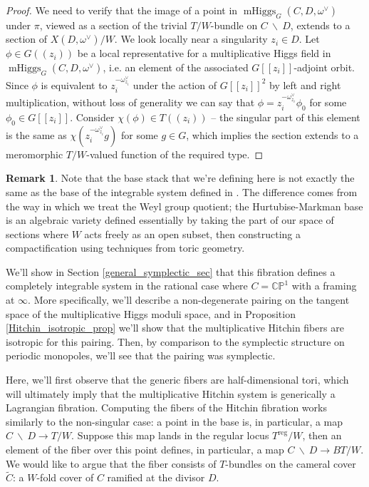 \documentclass[11pt, oneside, reqno]{amsart}
\theoremstyle{definition} \newtheorem{definition}{Definition}[section]
\theoremstyle{definition} \newtheorem{remark}[definition]{Remark}
\theoremstyle{definition} \newtheorem{remarks}[definition]{Remarks}
\theoremstyle{definition} \newtheorem{question}[definition]{Question}
\theoremstyle{definition} \newtheorem*{note}{Note}
\theoremstyle{definition} \newtheorem{example}[definition]{Example}
\theoremstyle{definition} \newtheorem{examples}[definition]{Examples}
\newcommand{\bb}[1]{\mathbb{#1}}
\newcommand{\mr}[1]{\mathrm{#1}}
\newcommand{\wt}[1]{\widetilde{#1}}
\newcommand{\bs}{\ \backslash \ }
\DeclareMathOperator{\mhiggs}{mHiggs}
\begin{document}
\begin{proof}
We need to verify that the image of a point in $\mhiggs_G(C,D,\omega^\vee)$ under $\pi$, viewed as a section of the trivial $T/W$-bundle on $C \bs D$, extends to a section of $X(D,\omega^\vee)/W$.  We look locally near a singularity $z_i \in D$.  Let $\phi \in G((z_i))$ be a local representative for a multiplicative Higgs field in $\mhiggs_G(C,D,\omega^\vee)$, i.e. an element of the associated $G[[z_i]]$-adjoint orbit.  Since $\phi$ is equivalent to $z_i^{-\omega^\vee_{z_i}}$ under the action of $G[[z_i]]^2$ by left and right multiplication, without loss of generality we can say that $\phi = z_i^{-\omega^\vee_{z_i}} \phi_0$ for some $\phi_0 \in G[[z_i]]$.  Consider $\chi(\phi) \in T((z_i))$ -- the singular part of this element is the same as $\chi(z_i^{-\omega^\vee_{z_i}} g)$ for some $g \in G$, which implies the section extends to a meromorphic $T/W$-valued function of the required type.
\end{proof}

\begin{remark}
Note that the base stack that we're defining here is not exactly the same as the base of the integrable system defined in \cite{HurtubiseMarkman}.  The difference comes from the way in which we treat the Weyl group quotient; the Hurtubise-Markman base is an algebraic variety defined essentially by taking the part of our space of sections where $W$ acts freely as an open subset, then constructing a compactification using techniques from toric geometry.
\end{remark}

We'll show in Section \ref{general_symplectic_sec} that this fibration defines a completely integrable system in the rational case where $C = \bb{CP}^1$ with a framing at $\infty$.  More specifically, we'll describe a non-degenerate pairing on the tangent space of the multiplicative Higgs moduli space, and in Proposition \ref{Hitchin_isotropic_prop} we'll show that the multiplicative Hitchin fibers are isotropic for this pairing.  Then, by comparison to the symplectic structure on periodic monopoles, we'll see that the pairing was symplectic.

Here, we'll first observe that the generic fibers are half-dimensional tori, which will ultimately imply that the multiplicative Hitchin system is generically a Lagrangian fibration.  Computing the fibers of the Hitchin fibration works similarly to the non-singular case: a point in the base is, in particular, a map $C \bs D \to T/W$.  Suppose this map lands in the regular locus $T^{\mr{reg}}/W$, then an element of the fiber over this point defines, in particular, a map $C \bs D \to BT/W$.  We would like to argue that the fiber consists of $T$-bundles on the cameral cover $\wt C$: a $W$-fold cover of $C$ ramified at the divisor $D$.
\end{document}
